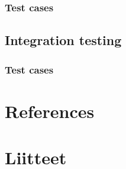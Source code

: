 \documentclass[a4paper, 12pt]{article}
\begin{document}
\subsubsection{Test cases}

\subsection{Integration testing}

\subsubsection{Test cases}

\section{References}

  

   














            
            
           
            
            
            
            
            
            
            
            
            
            \section*{Liitteet}
            
  
            
            
            
            
\end{document}
